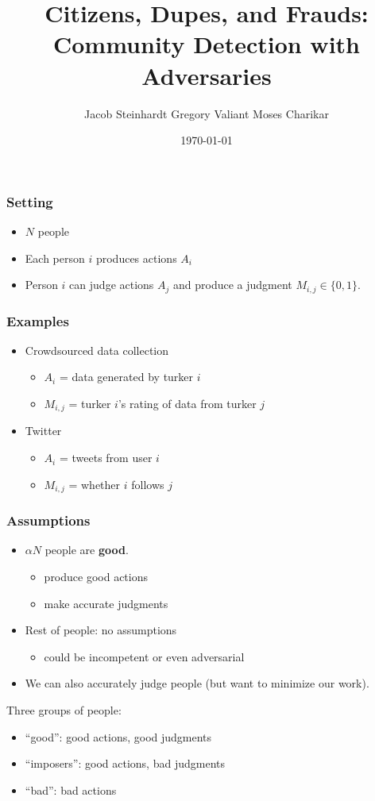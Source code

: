 \documentclass{beamer}
\title[Community Detection with Adversaries]{Citizens, Dupes, and Frauds: Community Detection with Adversaries}
\author[Steinhardt, Valiant, \& Charikar]{Jacob Steinhardt \quad Gregory Valiant \quad Moses Charikar}
\institute[Stanford]
{
Stanford University \\
}
\date{\today}
\begin{document}
%
\begin{frame}
\titlepage
\end{frame}
%
\begin{frame}
\frametitle{Setting}
\begin{itemize}
\item $N$ people
\item Each person $i$ produces actions $A_i$
\item Person $i$ can judge actions $A_j$ and produce a judgment $M_{i,j} \in \{0,1\}$.
\end{itemize}
\end{frame}

\begin{frame}
\frametitle{Examples}
\begin{itemize}
\item Crowdsourced data collection
\begin{itemize}
\item $A_i$ = data generated by turker $i$
\item $M_{i,j}$ = turker $i$'s rating of data from turker $j$
\end{itemize}
\pause
\item Twitter
\begin{itemize}
\item $A_i$ = tweets from user $i$
\item $M_{i,j}$ = whether $i$ follows $j$
\end{itemize}
\end{itemize}
\end{frame}

\begin{frame}
\frametitle{Assumptions}
\begin{itemize}
\item $\alpha N$ people are \textbf{good}.
\begin{itemize}
\item produce good actions
\item make accurate judgments
\end{itemize}
\pause
\item Rest of people: no assumptions
\begin{itemize}
\item could be incompetent or even adversarial
\end{itemize}
\pause
\item We can also accurately judge people (but want to minimize our work).
\end{itemize}
\pause
\vskip 0.2in
Three groups of people:
\begin{itemize}
\item ``good'': good actions, good judgments
\item ``imposers'': good actions, bad judgments
\item ``bad'': bad actions
\end{itemize}
\end{frame}
\end{document}
